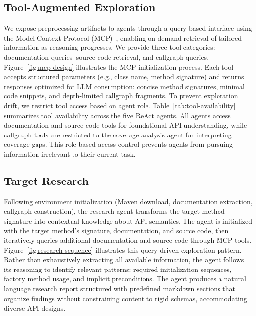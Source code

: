 \subsection{Tool-Augmented Exploration}%
\label{subsec:tool-augmented-exploration}
%
We expose preprocessing artifacts to agents through a query-based interface using the Model Context Protocol (MCP)~\cite{mcp2024}, enabling on-demand retrieval of tailored information as reasoning progresses.
%
We provide three tool categories: documentation queries, source code retrieval, and callgraph queries. Figure~\ref{fig:mcp-design} illustrates the MCP initialization process. Each tool accepts structured parameters (e.g., class name, method signature) and returns responses optimized for LLM consumption: concise method signatures, minimal code snippets, and depth-limited callgraph fragments.
To prevent exploration drift, we restrict tool access based on agent role. Table~\ref{tab:tool-availability} summarizes tool availability across the five ReAct agents. All agents access documentation and source code tools for foundational API understanding, while callgraph tools are restricted to the coverage analysis agent for interpreting coverage gaps. This role-based access control prevents agents from pursuing information irrelevant to their current task.

% 
%
\subsection{Target Research}%
\label{subsec:target-research}
Following environment initialization (Maven download, documentation extraction, callgraph construction), the research agent transforms the target method signature into contextual knowledge about API semantics. The agent is initialized with the target method's signature, documentation, and source code, then iteratively queries additional documentation and source code through MCP tools. Figure~\ref{fig:research-sequence} illustrates this query-driven exploration pattern. Rather than exhaustively extracting all available information, the agent follows its reasoning to identify relevant patterns: required initialization sequences, factory method usage, and implicit preconditions. The agent produces a natural language research report structured with predefined markdown sections that organize findings without constraining content to rigid schemas, accommodating diverse API designs.
